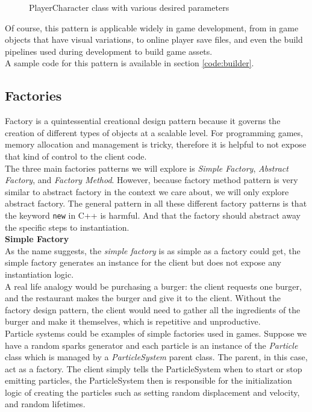 \begin{multicols}{2}
\begin{figure}[H]
	\caption{PlayerCharacter class with various desired parameters}
	\label{fig:playercharacter-2}
\end{figure}

Of course, this pattern is applicable widely in game development, from in game objects that have visual variations, to online player save files, and even the build pipelines used during development to build game assets.\bs
\\
A sample code for this pattern is available in section \ref{code:builder}.

\subsection{Factories}\label{section:factories}

Factory is a quintessential creational design pattern because it governs the creation of different types of objects at a scalable level. For programming games, memory allocation and management is tricky, therefore it is helpful to not expose that kind of control to the client code.\bs
\\
The three main factories patterns we will explore is \textit{Simple Factory}, \textit{Abstract Factory}, and \textit{Factory Method}. However, because factory method pattern is very similar to abstract factory\cite{sm-factory-method} in the context we care about, we will only explore abstract factory. The general pattern in all these different factory patterns is that the keyword \texttt{new} in C++ is harmful. And that the factory should abstract away the specific steps to instantiation.\bs
\\
\textbf{Simple Factory}\\
As the name suggests, the \textit{simple factory} is as simple as a factory could get, the simple factory generates an instance for the client but does not expose any instantiation logic.\cite{simple-factory}\bs
\\
A real life analogy would be purchasing a burger: the client requests one burger, and the restaurant makes the burger and give it to the client. Without the factory design pattern, the client would need to gather all the ingredients of the burger and make it themselves, which is repetitive and unproductive.\bs
\\
Particle systems could be examples of simple factories used in games. Suppose we have a random sparks generator and each particle is an instance of the \textit{Particle} class which is managed by a \textit{ParticleSystem} parent class. The parent, in this case, act as a factory. The client simply tells the ParticleSystem when to start or stop emitting particles, the ParticleSystem then is responsible for the initialization logic of creating the particles such as setting random displacement and velocity, and random lifetimes.\bs

\end{multicols}
